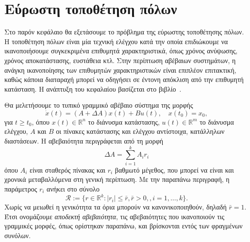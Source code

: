 \chapter{Εύρωστη τοποθέτηση πόλων}\label{ch:pp}
Στο παρόν κεφάλαιο θα εξετάσουμε το πρόβλημα της εύρωστης τοποθέτησης πόλων. Η
τοποθέτηση πόλων είναι μία τεχνική ελέγχου κατά την οποία επιδιώκουμε να
ικανοποιήσουμε συγκεκριμένα επιθυμητά χαρακτηριστικά, όπως χρόνος ανύψωσης,
χρόνος αποκατάστασης, ευστάθεια κτλ. Στην περίπτωση αβέβαιων συστημάτων, η
ανάγκη ικανοποίησης των επιθυμητών χαρακτηριστικών είναι επιπλέον επιτακτική,
καθώς κάποια διαταραχή μπορεί να οδηγήσει σε έντονη απόκλιση από την επιθυμητή
κατάσταση. Η ανάπτυξη του κεφαλαίου βασίζεται στο
βιβλίο~\cite{kosmidou2009robust}.

Θα μελετήσουμε το τυπικό γραμμικό αβέβαιο σύστημα της μορφής
\begin{equation}\label{eq:pp_un_ss}
    \dot{x}(t) = (A + \Delta A)x(t) + Bu(t), \quad x(t_0) = x_0,
\end{equation}
για \( t \geq t_0 \), όπου \( x(t) \in \mathbb{R}^n \) το διάνυσμα κατάστασης,
\( u(t) \in \mathbb{R}^m \) το διάνυσμα ελέγχου, \( A \) και \( B \) οι πίνακες
κατάστασης και ελέγχου αντίστοιχα, κατάλληλων διαστάσεων. Η αβεβαιότητα
περιγράφεται από τη μορφή
\[
    \Delta A = \sum_{i = 1}^{k} A_i r_i
\]
όπου \( A_i \) είναι σταθερός πίνακας και \( r_i \) βαθμωτό μέγεθος, που μπορεί
να είναι και χρονικά μεταβαλλόμενα στη γενική περίπτωση. Με την παραπάνω
περιγραφή, η παράμετρος \( r_i \) ανήκει στο σύνολο
\[
    \mathcal{R} := \{ r \in \mathbb{R}^k: |r_i| \leq \bar{r}, \bar{r} > 0, ,i =
        1, \dots, k \}.
\]
Χωρίς να μειωθεί η γενικότητα τα όρια μπορούν να κανονικοποιηθούν, δηλαδή \(
\bar{r} =  1 \). Έτσι ονομάζουμε \emph{αποδεκτή αβεβαιότητα}, τις αβεβαιότητες
που ικανοποιούν τις γραμμικές μορφές, όπως ορίστηκαν παραπάνω, και βρίσκονται
εντός των φραγμένων συνόλων.

